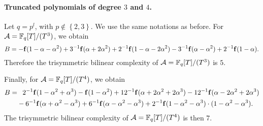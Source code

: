 \documentclass[11pt]{article}
\begin{document}
\paragraph{Truncated polynomials of degree $3$ and $4$.} Let $q=p^l$, with
$p\notin\left\{ 2, 3 \right\}$. We use the same notations as before. For
$\mathcal{A}=\mathbb{F}_{q}[T]/(T^3)$, we obtain
\[
  B =
  -\mathbf{f}(1-\alpha-\alpha^2)+3^{-1}\mathbf{f}(\alpha+2\alpha^2)
  +2^{-1}\mathbf{f}(1-\alpha-2\alpha^2) -
  3^{-1}\mathbf{f}(\alpha-\alpha^2)
  +2^{-1}\mathbf{f}(1-\alpha).
\]
Therefore the trisymmetric bilinear complexity of
$\mathcal{A}=\mathbb{F}_q[T]/(T^3)$ is $5$.

Finally, for $\mathcal{A}=\mathbb{F}_{q}[T]/(T^4)$, we obtain
\begin{equation*}
  \begin{split}
    B =&\phantom{-}2^{-1}\mathbf{f}(1-\alpha^2+\alpha^3)-\mathbf{f}(1-\alpha^2)
  +12^{-1}\mathbf{f}(\alpha+2\alpha^2+2\alpha^3)
  -12^{-1}\mathbf{f}(\alpha-2\alpha^2+2\alpha^3)\\
  &-6^{-1}\mathbf{f}(\alpha+\alpha^2-\alpha^3)
  +6^{-1}\mathbf{f}(\alpha-\alpha^2-\alpha^3)
  +2^{-1}\mathbf{f}(1-\alpha^2-\alpha^3)\cdot(1-\alpha^2-\alpha^3).
  \end{split}
\end{equation*}
The trisymmetric bilinear complexity of $\mathcal{A}=\mathbb{F}_q[T]/(T^4)$ is then $7$.
\end{document}
